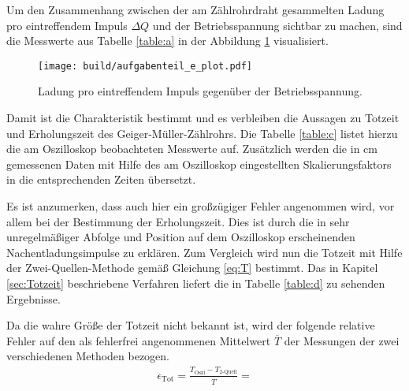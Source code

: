 Um den Zusammenhang zwischen der am Zählrohrdraht gesammelten Ladung pro eintreffendem Impuls $\Delta Q$ und der Betriebsspannung sichtbar zu machen, sind die Messwerte aus Tabelle \ref{table:a} in der Abbildung \ref{fig:plot2} visualisiert.
\begin{figure}
  \centering
  \texttt{[image: build/aufgabenteil\_e\_plot.pdf]}
  \caption{Ladung pro eintreffendem Impuls gegenüber der Betriebsspannung.}
  \label{fig:plot2}
\end{figure}
Damit ist die Charakteristik bestimmt und es verbleiben die Aussagen zu Totzeit und Erholungszeit des Geiger-Müller-Zählrohrs. Die Tabelle \ref{table:c} listet hierzu die am Oszilloskop beobachteten Messwerte auf. Zusätzlich werden die in $\si{\centi\meter}$ gemessenen Daten mit Hilfe des am Oszilloskop eingestellten Skalierungsfaktors in die entsprechenden Zeiten übersetzt.

Es ist anzumerken, dass auch hier ein großzügiger Fehler angenommen wird, vor allem bei der Bestimmung der Erholungszeit. Dies ist durch die in sehr unregelmäßiger Abfolge und Position auf dem Oszilloskop erscheinenden Nachentladungsimpulse zu erklären.
Zum Vergleich wird nun die Totzeit mit Hilfe der Zwei-Quellen-Methode gemäß Gleichung \eqref{eq:T} bestimmt. Das in Kapitel \ref{sec:Totzeit} beschriebene Verfahren liefert die in Tabelle \ref{table:d} zu sehenden Ergebnisse.

Da die wahre Größe der Totzeit nicht bekannt ist, wird der folgende relative Fehler auf den als fehlerfrei angenommenen Mittelwert $\overline{T}$ der Messungen der zwei verschiedenen Methoden bezogen.
\begin{align*}
  \epsilon_\text{Tot} = \frac{T_\text{Oszi} - T_\text{2-Quell}} {\overline{T}} = 
\end{align*}


